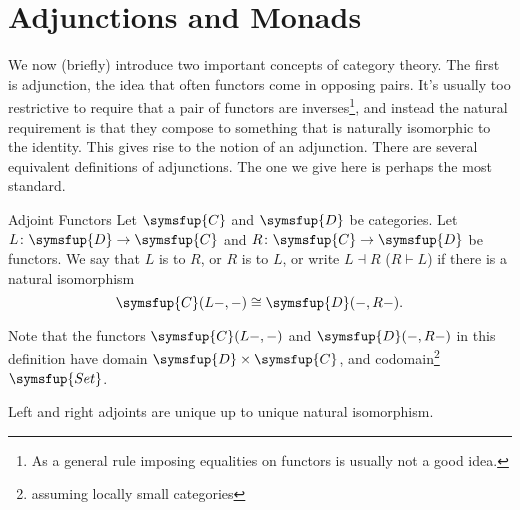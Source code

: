 \documentclass[fleqn]{NotesClass}
\makeatletter
\newcommand{\cat}[1]{\symsfup{#1}}
\newcommand{\c@egory}[1]{\symsfup{#1}}
\newcommand{\Set}{\c@egory{Set}}
\newcommand{\isomorphic}{\cong}
\newcommand{\leftadjointto}{\dashv}
\newcommand{\rightadjointto}{\vdash}
\makeatother
\begin{document}
    \section{Adjunctions and Monads}
    We now (briefly) introduce two important concepts of category theory.
    The first is adjunction, the idea that often functors come in opposing pairs.
    It's usually too restrictive to require that a pair of functors are inverses\footnote{As a general rule imposing equalities on functors is usually not a good idea.}, and instead the natural requirement is that they compose to something that is naturally isomorphic to the identity.
    This gives rise to the notion of an adjunction.
    There are several equivalent definitions of adjunctions.
    The one we give here is perhaps the most standard.
    
    \begin{dfn}{Adjoint Functors}{}
        Let \(\cat{C}\) and \(\cat{D}\) be categories.
        Let \(L \colon \cat{D} \to \cat{C}\) and \(R \colon \cat{C} \to \cat{D}\) be functors.
        We say that \(L\) is  to \(R\), or \(R\) is  to \(L\), or write \(L \leftadjointto R\) (\(R \rightadjointto L\)) if there is a natural isomorphism
        \begin{equation}
            \cat{C}(L-, -) \isomorphic \cat{D}(-, R-).
        \end{equation}
    \end{dfn}
    
    Note that the functors \(\cat{C}(L-, -)\) and \(\cat{D}(-, R-)\) in this definition have domain \(\cat{D} \times \cat{C}\), and codomain\footnote{assuming locally small categories} \(\Set\).
    
    \begin{lma}{}{}
        Left and right adjoints are unique up to unique natural isomorphism.
    \end{lma}
    
\end{document}
